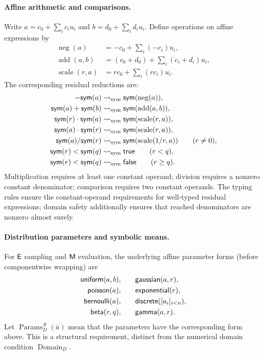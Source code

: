 \paragraph{Affine arithmetic and comparisons.}
Write
$a=c_0+\sum_i c_i u_i$ and
$b=d_0+\sum_i d_i u_i$.
Define operations on affine expressions by
\[
\begin{aligned}
\operatorname{neg}(a)
  &=-c_0+\sum_i(-c_i)u_i,\\
\operatorname{add}(a,b)
  &=(c_0+d_0)+\sum_i(c_i+d_i)u_i,\\
\operatorname{scale}(r,a)
  &=rc_0+\sum_i(rc_i)u_i.
\end{aligned}
\]
The corresponding residual reductions are:
\[
\begin{aligned}
-\mathsf{sym}(a)
  &\rightsquigarrow_{\mathrm{sym}}\mathsf{sym}(\operatorname{neg}(a)),\\
\mathsf{sym}(a)+\mathsf{sym}(b)
  &\rightsquigarrow_{\mathrm{sym}}\mathsf{sym}(\operatorname{add}(a,b)),\\
\mathsf{sym}(r)\cdot\mathsf{sym}(a)
  &\rightsquigarrow_{\mathrm{sym}}\mathsf{sym}(\operatorname{scale}(r,a)),\\
\mathsf{sym}(a)\cdot\mathsf{sym}(r)
  &\rightsquigarrow_{\mathrm{sym}}\mathsf{sym}(\operatorname{scale}(r,a)),\\
\mathsf{sym}(a)/\mathsf{sym}(r)
  &\rightsquigarrow_{\mathrm{sym}}
    \mathsf{sym}(\operatorname{scale}(1/r,a))\qquad(r\ne0),\\
\mathsf{sym}(r)<\mathsf{sym}(q)
  &\rightsquigarrow_{\mathrm{sym}}\mathsf{true}\qquad(r<q),\\
\mathsf{sym}(r)<\mathsf{sym}(q)
  &\rightsquigarrow_{\mathrm{sym}}\mathsf{false}\qquad(r\ge q).
\end{aligned}
\]
Multiplication requires at least one constant operand;
division requires a nonzero constant denominator;
comparison requires two constant operands.
The typing rules ensure the constant-operand requirements for
well-typed residual expressions; domain safety additionally ensures
that reached denominators are nonzero almost surely.

\paragraph{Distribution parameters and symbolic means.}
For $\mathsf{E}$ sampling and $\mathsf{M}$ evaluation, the underlying affine
parameter forms (before componentwise wrapping) are
\[
\begin{aligned}
\mathsf{uniform}(a,b),\qquad&
\mathsf{gaussian}(a,r),\\
\mathsf{poisson}(a),\qquad&
\mathsf{exponential}(r),\\
\mathsf{bernoulli}(a),\qquad&
\mathsf{discrete}([a_i]_{i<n}),\\
\mathsf{beta}(r,q),\qquad&
\mathsf{gamma}(a,r).
\end{aligned}
\]
Let $\operatorname{Params}^{\#}_D(\bar a)$ mean that
the parameters have the corresponding form above.
This is a structural requirement, distinct from
the numerical domain condition $\operatorname{Domain}_D$.

